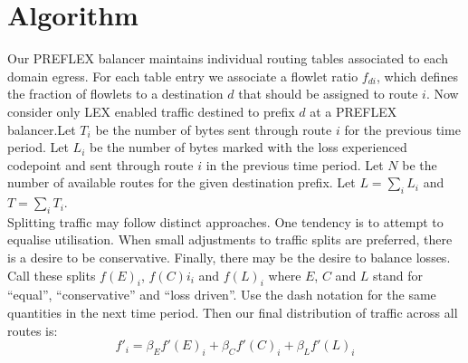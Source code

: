 \documentclass[12pt]{article}
\begin{document}
\section*{Algorithm}

Our PREFLEX balancer maintains individual routing tables associated to each domain egress. For each table entry we associate a flowlet ratio $f_{di}$, which defines the fraction of flowlets to a destination $d$ that should be assigned to route $i$. Now consider only LEX enabled traffic destined to prefix $d$ at a PREFLEX balancer.Let $T_{i}$ be the number of bytes sent through route $i$ for the previous time period. Let $L_{i}$ be the number of bytes marked with the loss experienced codepoint and sent through route $i$ in the previous time period. Let $N$ be the number of available routes for the given destination prefix. Let $L = {\sum_{i} L_{i}}$ and $T = {\sum_{i} T_{i}}$.
\\Splitting traffic may follow distinct approaches.  One tendency is to attempt to equalise utilisation. When small adjustments to traffic splits are preferred, there is a desire to
 be conservative. Finally, there may be the desire to balance losses. Call these splits $f(E)_{i}$, $f(C)i_{i}$ and $f(L)_{i}$ where $E$, $C$ and $L$ stand for “equal”, “conservative” and “loss driven”. Use the dash notation for the same quantities in the next time period. Then our final distribution of traffic across all routes is:
\begin{equation}
f'_{i} = \beta_{E}f'(E)_{i} + \beta_{C}f'(C)_{i} + \beta_{L}f'(L)_{i}
\end{equation}
\end{document}
